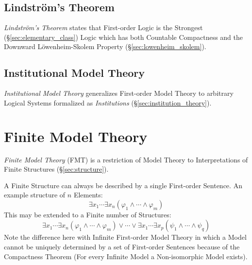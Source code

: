 \subsection{Lindstr\"om's Theorem}\label{sec:lindstroms_theorem}

\emph{Lindstr\"om's Theorem} states that First-order Logic is the
Strongest (\S\ref{sec:elementary_class}) Logic which has both
Countable Compactness and the Downward L\"owenheim-Skolem Property
(\S\ref{sec:lowenheim_skolem}).



\subsection{Institutional Model Theory}\label{sec:institutional_model}

\emph{Institutional Model Theory} generalizes First-order Model Theory
to arbitrary Logical Systems formalized as \emph{Institutions}
(\S\ref{sec:institution_theory}).



\section{Finite Model Theory}\label{sec:finite_model}

\emph{Finite Model Theory} (FMT) is a restriction of Model Theory to
Interpretations of Finite Structures (\S\ref{sec:structure}).

A Finite Structure can always be described by a single First-order
Sentence. An example structure of $n$ Elements:
\[
    \exists x_1 \cdots \exists x_n ( \varphi_1 \wedge \cdots \wedge
    \varphi_m )
\]
This may be extended to a Finite number of Structures:
\[
    \exists x_1 \cdots \exists x_n ( \varphi_1 \wedge \cdots \wedge
    \varphi_m )
    \vee
    \cdots
    \vee
    \exists x_1 \cdots \exists x_p ( \psi_1 \wedge \cdots \wedge
    \psi_q )
\]
Note the difference here with Infinite First-order Model Theory in
which a Model cannot be uniquely determined by a set of First-order
Sentences because of the Compactness Theorem (For every Infinite Model
a Non-isomorphic Model exists).

